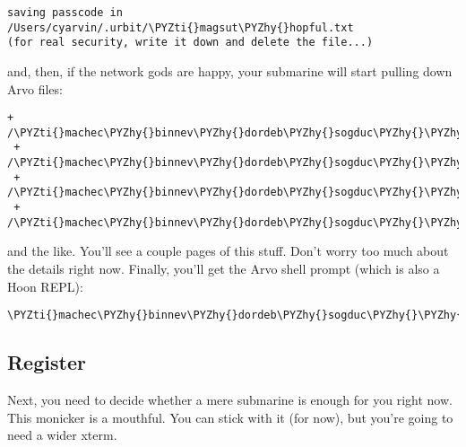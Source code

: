 \begin{framed_shaded}
\begin{Verbatim}[fontsize=\relsize{-2.5},fontseries=b,commandchars=\\\{\}]
saving passcode in /Users/cyarvin/.urbit/\PYZti{}magsut\PYZhy{}hopful.txt
(for real security, write it down and delete the file...)
\end{Verbatim}
\end{framed_shaded}
and, then, if the network gods are happy, your submarine will start pulling
down Arvo files:

\begin{framed_shaded}
\begin{Verbatim}[fontsize=\relsize{-2.5},fontseries=b,commandchars=\\\{\}]
 + /\PYZti{}machec\PYZhy{}binnev\PYZhy{}dordeb\PYZhy{}sogduc\PYZhy{}\PYZhy{}dosmul\PYZhy{}sarrum\PYZhy{}faplec\PYZhy{}nidted/main/1/bin/ticket/hoon
 + /\PYZti{}machec\PYZhy{}binnev\PYZhy{}dordeb\PYZhy{}sogduc\PYZhy{}\PYZhy{}dosmul\PYZhy{}sarrum\PYZhy{}faplec\PYZhy{}nidted/main/1/bin/reset/hoon
 + /\PYZti{}machec\PYZhy{}binnev\PYZhy{}dordeb\PYZhy{}sogduc\PYZhy{}\PYZhy{}dosmul\PYZhy{}sarrum\PYZhy{}faplec\PYZhy{}nidted/main/1/bin/ye/hoon
 + /\PYZti{}machec\PYZhy{}binnev\PYZhy{}dordeb\PYZhy{}sogduc\PYZhy{}\PYZhy{}dosmul\PYZhy{}sarrum\PYZhy{}faplec\PYZhy{}nidted/main/1/bin/ls/hoon
\end{Verbatim}
\end{framed_shaded}
and the like.  You'll see a couple pages of this stuff.  Don't worry too much
about the details right now.  Finally, you'll get the Arvo shell prompt (which
is also a Hoon REPL):

\begin{framed_shaded}
\begin{Verbatim}[fontsize=\relsize{-2.5},fontseries=b,commandchars=\\\{\}]
\PYZti{}machec\PYZhy{}binnev\PYZhy{}dordeb\PYZhy{}sogduc\PYZhy{}\PYZhy{}dosmul\PYZhy{}sarrum\PYZhy{}faplec\PYZhy{}nidted/try=\PYZgt{}
\end{Verbatim}
\end{framed_shaded}

\subsection{Register}

Next, you need to decide whether a mere submarine is enough for
you right now.  This monicker is a mouthful.  You can stick with
it (for now), but you're going to need a wider xterm.

